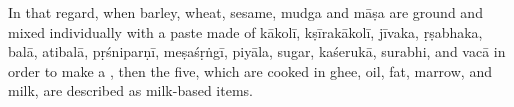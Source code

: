 \begin{translation}
    In that regard,
    when
    barley,
    wheat, sesame,
    \gls{mudga} and
    \gls{māṣa} are ground and mixed individually
    with a paste made of
    \gls{kākolī},
    \gls{kṣīrakākolī},
    \gls{jīvaka},
    \gls{ṛṣabhaka},
    \gls{balā},
    \gls{atibalā},
    \gls{pṛśniparṇī},
    \gls{meṣaśṛṅgī},
    \gls{piyāla},
    sugar,
    \gls{kaśerukā},
    \gls{surabhi}, and
    \gls{vacā}
    in order to make a ,
    then the five, which are cooked in ghee, oil, fat,
    marrow,
    and milk, are described as milk-based items.





\end{translation}
